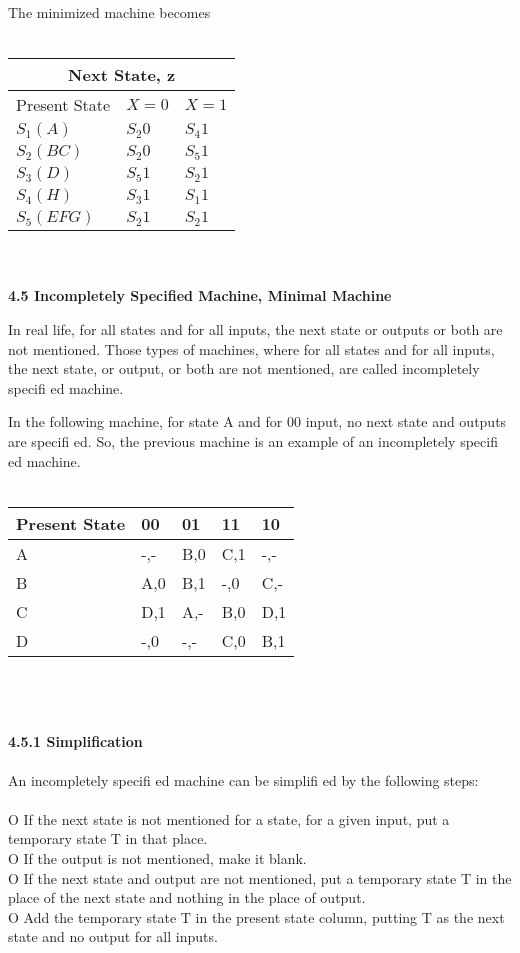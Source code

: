 \documentclass[12pt,a4paper,openany]{book}
\begin{document}
The minimized machine becomes
\\
\\
\begin{tabular}{ |p{3cm}| |p{3cm}|p{3cm}| }
\hline
\multicolumn{3}{|c|}{Next State, z} \\
\hline
Present State  &   $X = 0$        &  $X = 1$   \\
\hline
$S_1(A)$         &    $S_2 0$      &    $S_4 1$  \\
$S_2(BC)$       &    $S_2 0$      &    $S_5 1$  \\
$S_3(D)$         &    $S_5 1$      &    $S_2 1$  \\
$S_4(H)$         &    $S_3 1$      &    $S_1 1$  \\
$S_5(EFG)$     &    $S_2 1$      &    $S_2 1$  \\
\hline
\end{tabular}
\\
\\
\textbf{
4.5 Incompletely Specified Machine, Minimal Machine
}

 In real life, for all states and for all inputs, the next state or outputs or both are not mentioned. Those types of machines, where for all states and for all inputs, the next state, or output, or both are not mentioned, are called incompletely speciﬁ ed machine. 

In the following machine, for state A and for 00 input, no next state and outputs are speciﬁ ed. So, the previous machine is an example of an incompletely speciﬁ ed machine.
\\
\\
\begin{tabular}{ |p{3cm}|p{2cm}|p{2cm}|p{2cm}|p{2cm}| }
\hline
Present State  &   00   &   01    &   11   &   10   \\
\hline
A  &   -,-   &   B,0    &   C,1   &   -,-   \\
B  &   A,0   &   B,1    &   -,0   &   C,-   \\
C  &   D,1   &   A,-    &   B,0   &   D,1   \\
D  &   -,0   &  -,-    &   C,0   &   B,1   \\
\hline
\end{tabular}
\\
\\
\\
\textbf{
4.5.1 Simplification
}
\\
\\
An incompletely speciﬁ ed machine can be simpliﬁ ed by the following steps: 
\\
\\
O  If the next state is not mentioned for a state, for a given input, put a temporary state T in that place. 
\\
O  If the output is not mentioned, make it blank. 
\\
O  If the next state and output are not mentioned, put a temporary state T in the place of the next state and nothing in the place of output. 
\\
O  Add the temporary state T in the present state column, putting T as the next state and no output for all inputs.
\\
\end{document}
